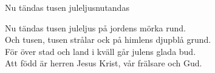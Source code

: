 \begin{song}{Nu tändas tusen juleljus}{nutandas}
\begin{vers}
Nu tändas tusen juleljus på jordens mörka rund.\\
Och tusen, tusen strålar ock på himlens djupblå grund.\\
För över stad och land i kväll går julens glada bud.\\
Att född är herren Jesus Krist, vår frälsare och Gud.
\end{vers}
\end{song}
